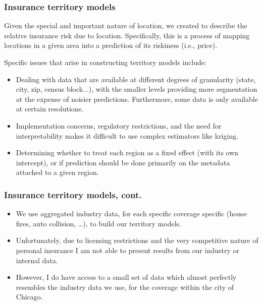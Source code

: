 \begin{frame}
  \frametitle{Insurance territory models}
  \footnotesize

  Given the special and important nature of location, we created
   to
  describe the relative insurance risk due to location. Specifically, this
  is a process of mapping locations in a given area into a prediction of
  its riskiness (i.e., price). \pause

  \medskip

  Specific issues that arise in constructing territory models include:
  \begin{itemize}
  \item Dealing with data that are available at different degrees
    of granularity (state, city, zip, census block...),
    with the smaller levels providing more segmentation at the expense of
    noisier predictions. Furthermore, some data is only available at certain resolutions. \pause
  \item Implementation concerns, regulatory restrictions, and the need for
    interpretability makes it difficult to use complex estimators like
    kriging. \pause
  \item Determining whether to treat each region as a fixed effect (with its
    own intercept), or if prediction should be done primarily on the metadata attached
    to a given region.
  \end{itemize}

\end{frame}

\begin{frame}
  \frametitle{Insurance territory models, cont.}
  \footnotesize

  \begin{itemize}
  \item We use aggregated industry data, for each specific coverage specific
    (house fires, auto collision, \ldots), to build our territory models.
  \item Unfortunately, due to licensing restrictions and the very competitive
    nature of personal insurance I am not able to present results from our
    industry or internal data.
  \item However, I do have access to a small set of data which almost perfectly resembles
    the industry data we use, for the
     coverage within the city of Chicago.
  \end{itemize}

\end{frame}


